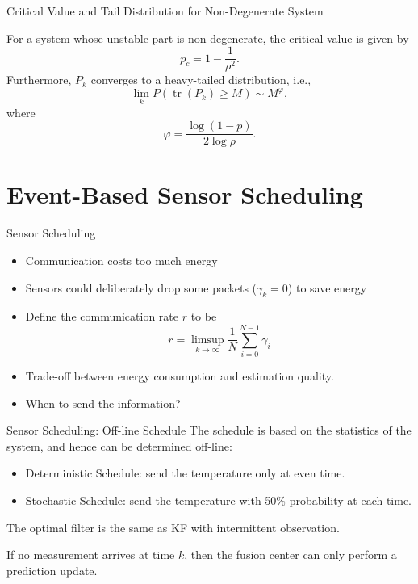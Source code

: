 \documentclass{beamer}
\DeclareMathOperator{\tr}{tr}
\begin{document}
  \begin{frame}{Critical Value and Tail Distribution for Non-Degenerate System}
    \begin{theorem}
      For a system whose unstable part is non-degenerate, the critical value is given by
      \begin{displaymath}
	p_c = 1-\frac{1}{\rho^2}.
      \end{displaymath}
      Furthermore, $P_k$ converges to a heavy-tailed distribution, i.e.,
      \begin{displaymath}
	\lim_k P(\tr(P_k)\geq M) \sim M^\varphi,
      \end{displaymath}
      where 
      \begin{displaymath}
	\varphi = \frac{\log(1-p)}{2\log \rho}.	
      \end{displaymath}
    \end{theorem}
  \end{frame}

  \section{Event-Based Sensor Scheduling}

  \frame{\tableofcontents[currentsection]}
  \begin{frame}{Sensor Scheduling}
    \begin{itemize}
      \item Communication costs too much energy
      \item Sensors could deliberately drop some packets ($\gamma_k = 0$) to save energy
      \item Define the communication rate $r$ to be
	\begin{displaymath}
	  r = \limsup_{k\rightarrow\infty}\frac{1}{N}\sum_{i=0}^{N-1}\gamma_i 
	\end{displaymath}
      \item Trade-off between energy consumption and estimation quality.
      \item When to send the information?
    \end{itemize}
  \end{frame}

  \begin{frame}{Sensor Scheduling: Off-line Schedule}
      The schedule is based on the statistics of the system, and hence can be determined off-line:
    \begin{itemize}
      \item Deterministic Schedule: send the temperature only at even time. 
      \item Stochastic Schedule: send the temperature with 50\% probability at each time. 
    \end{itemize}
    The optimal filter is the same as KF with intermittent observation.

    If no measurement arrives at time $k$, then the fusion center can only perform a prediction update.
  \end{frame}
\end{document}
